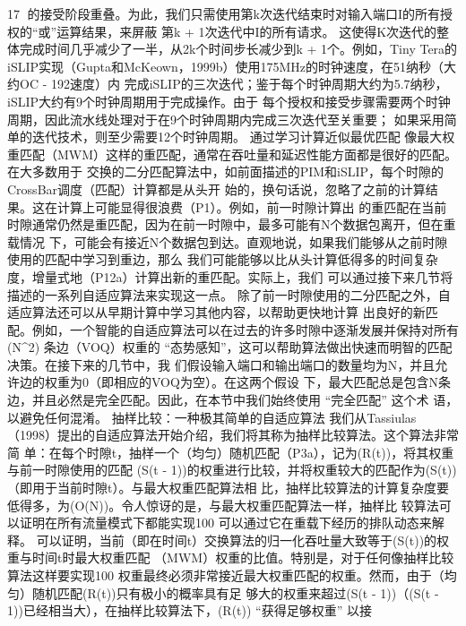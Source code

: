                                                       17
的接受阶段重叠。为此，我们只需使用第k次迭代结束时对输入端口I的所有授权的“或”运算结果，来屏蔽
第k + 1次迭代中I的所有请求。
这使得K次迭代的整体完成时间几乎减少了一半，从2k个时间步长减少到k + 1个。例如，Tiny Tera的
iSLIP实现（Gupta和McKeown，1999b）使用175MHz的时钟速度，在51纳秒（大约OC - 192速度）内
完成iSLIP的三次迭代；鉴于每个时钟周期大约为5.7纳秒，iSLIP大约有9个时钟周期用于完成操作。由于
每个授权和接受步骤需要两个时钟周期，因此流水线处理对于在9个时钟周期内完成三次迭代至关重要；
如果采用简单的迭代技术，则至少需要12个时钟周期。
通过学习计算近似最优匹配
像最大权重匹配（MWM）这样的重匹配，通常在吞吐量和延迟性能方面都是很好的匹配。在大多数用于
交换的二分匹配算法中，如前面描述的PIM和iSLIP，每个时隙的CrossBar调度（匹配）计算都是从头开
始的，换句话说，忽略了之前的计算结果。这在计算上可能显得很浪费（P1）。例如，前一时隙计算出
的重匹配在当前时隙通常仍然是重匹配，因为在前一时隙中，最多可能有N个数据包离开，但在重载情况
下，可能会有接近N个数据包到达。直观地说，如果我们能够从之前时隙使用的匹配中学习到重边，那么
我们可能能够以比从头计算低得多的时间复杂度，增量式地（P12a）计算出新的重匹配。实际上，我们
可以通过接下来几节将描述的一系列自适应算法来实现这一点。
除了前一时隙使用的二分匹配之外，自适应算法还可以从早期计算中学习其他内容，以帮助更快地计算
出良好的新匹配。例如，一个智能的自适应算法可以在过去的许多时隙中逐渐发展并保持对所有(N^{2})
条边（VOQ）权重的 “态势感知”，这可以帮助算法做出快速而明智的匹配决策。在接下来的几节中，我
们假设输入端口和输出端口的数量均为N，并且允许边的权重为0（即相应的VOQ为空）。在这两个假设
下，最大匹配总是包含N条边，并且必然是完全匹配。因此，在本节中我们始终使用 “完全匹配” 这个术
语，以避免任何混淆。
抽样比较：一种极其简单的自适应算法
我们从Tassiulas（1998）提出的自适应算法开始介绍，我们将其称为抽样比较算法。这个算法非常简
单：在每个时隙t，抽样一个（均匀）随机匹配（P3a），记为(R(t))，将其权重与前一时隙使用的匹配
(S(t - 1))的权重进行比较，并将权重较大的匹配作为(S(t))（即用于当前时隙t）。与最大权重匹配算法相
比，抽样比较算法的计算复杂度要低得多，为(O(N))。令人惊讶的是，与最大权重匹配算法一样，抽样比
较算法可以证明在所有流量模式下都能实现100%
可以通过它在重载下经历的排队动态来解释。
可以证明，当前（即在时间t）交换算法的归一化吞吐量大致等于(S(t))的权重与时间t时最大权重匹配
（MWM）权重的比值。特别是，对于任何像抽样比较算法这样要实现100%
权重最终必须非常接近最大权重匹配的权重。然而，由于（均匀）随机匹配(R(t))只有极小的概率具有足
够大的权重来超过(S(t - 1))（(S(t - 1))已经相当大），在抽样比较算法下，(R(t)) “获得足够权重” 以接
